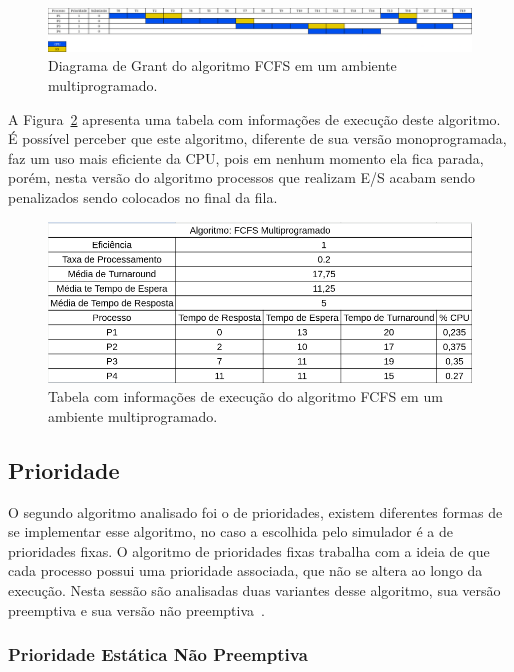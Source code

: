 \documentclass[
	12pt,				%
	oneside,   	        %
	a4paper,			%
	english,			%
	french,				%
	spanish,			%
	brazil,				%
	]{pacotes/abntex2}
\begin{document}
\begin{figure}[H]
  \centering
  \includegraphics[scale=0.20]{figuras/ex1/fcfs_multi.png}
  \caption{Diagrama de Grant do algoritmo FCFS em um ambiente multiprogramado.}
  \label{fig:fcfs_multi}
\end{figure}

A Figura~\ref{fig:table_fcfs_multi} apresenta uma tabela com informações de execução deste algoritmo. É possível perceber que este algoritmo, diferente de sua versão monoprogramada, faz um uso mais eficiente da CPU, pois em nenhum momento ela fica parada, porém, nesta versão do algoritmo processos que realizam E/S acabam sendo penalizados sendo colocados no final da fila.

\begin{figure}[H]
  \centering
  \includegraphics[scale=0.5]{figuras/ex1/table_fcfs_multi.png}
  \caption{Tabela com informações de execução do algoritmo FCFS em um ambiente multiprogramado.}
  \label{fig:table_fcfs_multi}
\end{figure}

\subsection{Prioridade}
\label{subsec:prio}

O segundo algoritmo analisado foi o de prioridades, existem diferentes formas de se implementar esse algoritmo, no caso a escolhida pelo simulador é a de prioridades fixas. O algoritmo de prioridades fixas trabalha com a ideia de que cada processo possui uma prioridade associada, que não se altera ao longo da execução. Nesta sessão são analisadas duas variantes desse algoritmo, sua versão preemptiva e sua versão não preemptiva~\cite{maziero2019}.

\subsubsection{Prioridade Estática Não Preemptiva}
\label{subsubsec:prio_sem_preemp}
\end{document}
